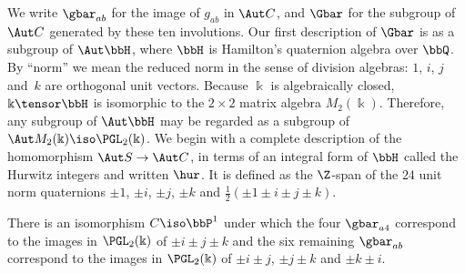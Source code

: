 We write $\gbar_{ab}$ for the image of $g_{ab}$ in $\Aut C$, and $\Gbar$ for the subgroup of $\Aut C$ generated by these ten involutions. Our first description of $\Gbar$ is as a subgroup of $\Aut\bbH$, where $\bbH$ is Hamilton's quaternion algebra over $\bbQ$. By ``norm'' we mean the reduced norm in the sense of division algebras: $1$, $i$, $j$ and~$k$ are orthogonal unit vectors. Because $\Bbbk$ is algebraically closed, $\Bbbk\tensor\bbH$ is isomorphic to the $2\times2$ matrix algebra $M_2(\Bbbk)$. Therefore, any subgroup of $\Aut\bbH$ may be regarded as a subgroup of $\Aut M_2(\Bbbk)\iso\PGL_2(\Bbbk)$. We begin with a complete description of the homomorphism $\Aut S\to\Aut C$, in terms of an integral form of $\bbH$ called the Hurwitz integers and written $\hur$. It is defined as the $\Z$-span of the $24$ unit norm quaternions $\pm1$, $\pm i$, $\pm j$, $\pm k$ and $\frac12(\pm1\pm i\pm j\pm k)$.

\begin{theo}\label{thm-F-equals-Gbar}
There is an isomorphism $C\iso\bbP^1$ under which the four $\gbar_{a4}$ correspond to the images in $\PGL_2(\Bbbk)$ of $\pm i\pm j\pm k$ and the six remaining $\gbar_{ab}$ correspond to the images in $\PGL_2(\Bbbk)$ of $\pm i\pm j$, $\pm j\pm k$ and $\pm k\pm i$.
\end{theo}

